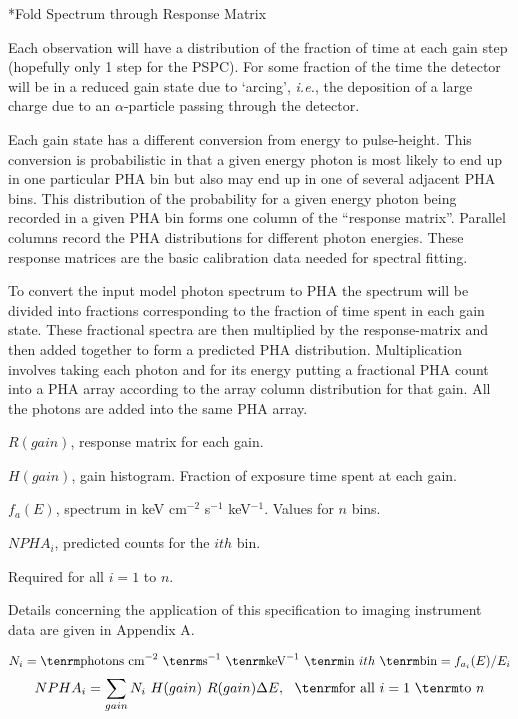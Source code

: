 \**Fold Spectrum through Response Matrix

{\list
 

Each observation will have a distribution of the fraction of time at each
gain step (hopefully only 1 step for the PSPC).  For some fraction of the
time the detector will be in a reduced gain state due to `arcing',
{\it i.e.},
the deposition of a large charge due to an $\alpha$-particle passing through the
detector.

Each gain state has a different conversion from energy to pulse-height.  This
conversion is probabilistic in that a given energy photon is most likely to
end up in one particular PHA bin but also may end up in one of several
adjacent PHA bins.  This distribution of the probability for a given energy
photon being recorded in a given PHA bin forms one column of the ``response
matrix''.  Parallel columns record the PHA distributions for different photon
energies.  These response matrices are the basic calibration data needed for
spectral fitting.

To convert the input model photon spectrum to PHA the spectrum will be divided
into fractions corresponding to the fraction of time spent in each gain state.
These fractional spectra are then multiplied by the response-matrix and then
added together to form a predicted PHA distribution.  Multiplication
involves taking each photon and for its energy putting a fractional PHA
count into a PHA array according to the array column distribution for that gain.
All the photons are added into the same PHA array.
 

$R(gain)$, response matrix for each gain.
 
$H(gain)$, gain histogram. Fraction of exposure time spent at each gain.
 
$f_a(E)$, spectrum in keV cm$^{-2}$ s$^{-1}$ keV$^{-1}$. Values for $n$ bins.
 

$NPHA_i$, predicted counts for the $ith$ bin.

Required for all $i= 1$ to $n$.
 

Details concerning the application of this specification to imaging instrument
data are given in Appendix A.

}

$$N_{i} = {\rm photons~cm}^{-2}~{\rm s}^{-1}~{\rm keV}^{-1}~ {\rm in}~ith~{\rm bin}
= f_{a_i}(E)/E_{i}$$
$$NPHA_i = \sum_{gain} N_i~H(gain)~R(gain) \Delta E, ~~{\rm
for~all}~i=1~{\rm to}~n$$

